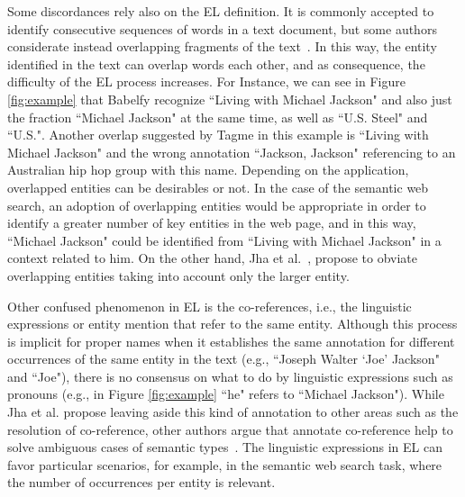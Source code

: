 \documentclass{llncs}
\begin{document}
Some discordances rely also on the EL definition. It is commonly accepted to identify  consecutive sequences of words in a text document, but some authors considerate instead overlapping fragments of the text~\cite{Babelfy14,Luo2015}. In this way, the entity identified in the text can overlap words each other, and as consequence, the difficulty of the EL process increases. For Instance, we can see in Figure \ref{fig:example} that Babelfy recognize ``Living with Michael Jackson" and also just the fraction ``Michael Jackson" at the same time, as well as ``U.S. Steel" and ``U.S.". Another overlap suggested by Tagme in this example is ``Living with Michael Jackson" and the wrong annotation ``Jackson, Jackson" referencing to an Australian hip hop group with this name. Depending on the application, overlapped entities can be desirables or not. In the case of the semantic web search, an adoption of overlapping entities would be appropriate in order to identify a greater number of key entities in the web page, and in this way, ``Michael Jackson" could be identified from ``Living with Michael Jackson" in a context related to him. On the other hand, Jha et al.~\cite{Jha2017}, propose to obviate overlapping entities taking into account only the larger entity.



Other confused phenomenon in EL is the co-references, i.e., the linguistic expressions or entity mention that refer to the same entity. Although this process is implicit for proper names when it establishes the same annotation for different occurrences of the same entity in the text (e.g., ``Joseph Walter `Joe' Jackson" and ``Joe"), there is no consensus on what to do by linguistic expressions such as pronouns (e.g., in Figure \ref{fig:example} ``he" refers to ``Michael Jackson"). While Jha et al. propose leaving aside this kind of annotation to other areas such as the resolution of co-reference, other authors argue that annotate co-reference help to solve ambiguous cases of semantic types~\cite{Durrett2014}. The linguistic expressions in EL can favor particular scenarios, for example, in the semantic web search task, where the number of occurrences per entity is relevant.
\end{document}
